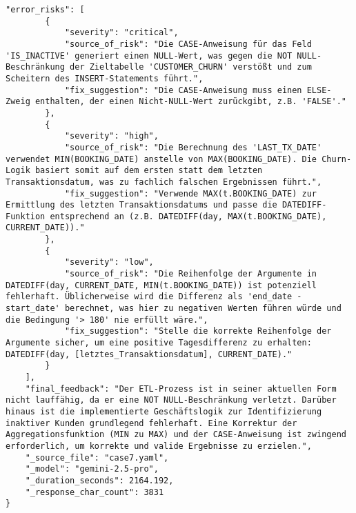 \begin{lstlisting}[caption={Ausgabe: Gemini 2.5 Pro Anwendungsfall 7 Konsistenzdurchlauf},label={gemini_case7_prompt2}]
    "error_risks": [
        {
            "severity": "critical",
            "source_of_risk": "Die CASE-Anweisung für das Feld 'IS_INACTIVE' generiert einen NULL-Wert, was gegen die NOT NULL-Beschränkung der Zieltabelle 'CUSTOMER_CHURN' verstößt und zum Scheitern des INSERT-Statements führt.",
            "fix_suggestion": "Die CASE-Anweisung muss einen ELSE-Zweig enthalten, der einen Nicht-NULL-Wert zurückgibt, z.B. 'FALSE'."
        },
        {
            "severity": "high",
            "source_of_risk": "Die Berechnung des 'LAST_TX_DATE' verwendet MIN(BOOKING_DATE) anstelle von MAX(BOOKING_DATE). Die Churn-Logik basiert somit auf dem ersten statt dem letzten Transaktionsdatum, was zu fachlich falschen Ergebnissen führt.",
            "fix_suggestion": "Verwende MAX(t.BOOKING_DATE) zur Ermittlung des letzten Transaktionsdatums und passe die DATEDIFF-Funktion entsprechend an (z.B. DATEDIFF(day, MAX(t.BOOKING_DATE), CURRENT_DATE))."
        },
        {
            "severity": "low",
            "source_of_risk": "Die Reihenfolge der Argumente in DATEDIFF(day, CURRENT_DATE, MIN(t.BOOKING_DATE)) ist potenziell fehlerhaft. Üblicherweise wird die Differenz als 'end_date - start_date' berechnet, was hier zu negativen Werten führen würde und die Bedingung '> 180' nie erfüllt wäre.",
            "fix_suggestion": "Stelle die korrekte Reihenfolge der Argumente sicher, um eine positive Tagesdifferenz zu erhalten: DATEDIFF(day, [letztes_Transaktionsdatum], CURRENT_DATE)."
        }
    ],
    "final_feedback": "Der ETL-Prozess ist in seiner aktuellen Form nicht lauffähig, da er eine NOT NULL-Beschränkung verletzt. Darüber hinaus ist die implementierte Geschäftslogik zur Identifizierung inaktiver Kunden grundlegend fehlerhaft. Eine Korrektur der Aggregationsfunktion (MIN zu MAX) und der CASE-Anweisung ist zwingend erforderlich, um korrekte und valide Ergebnisse zu erzielen.",
    "_source_file": "case7.yaml",
    "_model": "gemini-2.5-pro",
    "_duration_seconds": 2164.192,
    "_response_char_count": 3831
}
\end{lstlisting}

